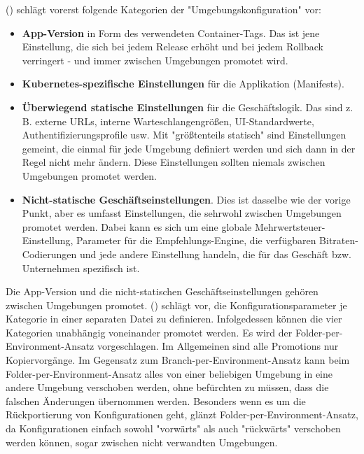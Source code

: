 \citeauthor{codefreshHowToModelGitOpsEnvironmentsAndPromote} (\citeyear{codefreshHowToModelGitOpsEnvironmentsAndPromote})
schlägt vorerst folgende Kategorien der "Umgebungskonfiguration" vor:

\begin{itemize}
    \item \textbf{App-Version} in Form des verwendeten Container-Tags. Das ist jene Einstellung, die sich bei jedem Release erhöht und bei jedem Rollback verringert - und immer zwischen Umgebungen promotet wird.
    \item \textbf{Kubernetes-spezifische Einstellungen} für die Applikation (Manifests).
    \item \textbf{Überwiegend statische Einstellungen} für die Geschäftslogik. Das sind z. B. externe URLs, interne Warteschlangengrößen, UI-Standardwerte, Authentifizierungsprofile usw. Mit "größtenteils statisch" sind Einstellungen gemeint, die einmal für jede Umgebung definiert werden und sich dann in der Regel nicht mehr ändern. Diese Einstellungen sollten niemals zwischen Umgebungen promotet werden.
    \item \textbf{Nicht-statische Geschäftseinstellungen}. Dies ist dasselbe wie der vorige Punkt, aber es umfasst Einstellungen, die sehrwohl zwischen Umgebungen promotet werden. Dabei kann es sich um eine globale Mehrwertsteuer-Einstellung, Parameter für die Empfehlungs-Engine, die verfügbaren Bitraten-Codierungen und jede andere Einstellung handeln, die für das Geschäft bzw. Unternehmen spezifisch ist.
\end{itemize}

Die App-Version und die nicht-statischen Geschäftseinstellungen gehören zwischen Umgebungen promotet.
\citeauthor{codefreshHowToModelGitOpsEnvironmentsAndPromote} (\citeyear{codefreshHowToModelGitOpsEnvironmentsAndPromote})
schlägt vor, die Konfigurationsparameter je Kategorie in einer separaten Datei zu definieren.
Infolgedessen können die vier Kategorien unabhängig voneinander promotet werden.
Es wird der Folder-per-Environment-Ansatz vorgeschlagen.
Im Allgemeinen sind alle Promotions nur Kopiervorgänge. 
Im Gegensatz zum Branch-per-Environment-Ansatz kann beim Folder-per-Environment-Ansatz 
alles von einer beliebigen Umgebung in eine andere Umgebung verschoben werden, 
ohne befürchten zu müssen, dass die falschen Änderungen übernommen werden. 
Besonders wenn es um die Rückportierung von Konfigurationen geht, glänzt Folder-per-Environment-Ansatz, 
da Konfigurationen einfach sowohl "vorwärts" als auch "rückwärts" verschoben werden können, 
sogar zwischen nicht verwandten Umgebungen.
\bigskip


